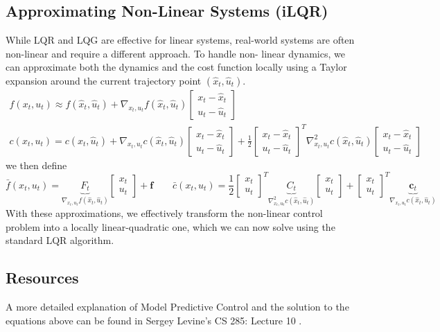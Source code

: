 \subsection{Approximating Non-Linear Systems (iLQR)}
While LQR and LQG are effective for linear systems, real-world systems are often non-linear and require a different approach. To handle non-
linear dynamics, we can approximate both the dynamics and the cost function locally using a Taylor expansion around the current trajectory 
point $(\hat{x}_t,\hat{u}_t)$.
 \begin{gather*}
     f(x_t,u_t) \approx  f(\hat{x}_t,\hat{u}_t)+ \nabla_{x_t,u_t} f(\hat{x}_t,\hat{u}_t) \begin{bmatrix} 
x_t- \hat{x}_t\\ u_t- \hat{u}_t 
\end{bmatrix} \\
c(x_t,u_t) = c(\hat{x}_t,\hat{u}_t) + \nabla_{x_t,u_t} c(\hat{x}_t,\hat{u}_t) \begin{bmatrix} 
x_t- \hat{x}_t\\ u_t- \hat{u}_t 
\end{bmatrix}+
\frac{1}{2} \begin{bmatrix} 
x_t- \hat{x}_t\\ u_t- \hat{u}_t 
\end{bmatrix}^T 
\nabla_{x_t,u_t}^2 c(\hat{x}_t,\hat{u}_t)
\begin{bmatrix} 
x_t- \hat{x}_t\\ u_t- \hat{u}_t 
\end{bmatrix}
 \end{gather*}
 we then define 
$$ \bar{f}(x_t,u_t) = \underbrace{F_t}_{ \nabla_{x_t,u_t} f(\hat{x}_t,\hat{u}_t)}
\begin{bmatrix} 
x_t\\ u_t 
\end{bmatrix}
 + \mathbf{f} \qquad 
 \bar{c}(x_t,u_t) = \frac{1}{2} \begin{bmatrix} 
x_t\\ u_t 
\end{bmatrix}^T \underbrace{C_t}_{\nabla_{x_t,u_t}^2 c(\hat{x}_t,\hat{u}_t)} \begin{bmatrix} 
x_t\\ u_t 
\end{bmatrix}+ \begin{bmatrix} 
x_t\\ u_t 
\end{bmatrix}^T \underbrace{\mathbf{c}_t}_{\nabla_{x_t,u_t} c(\hat{x}_t,\hat{u}_t)}$$
With these approximations, we effectively transform the non-linear control problem into a locally linear-quadratic one, which we can now 
solve using the standard LQR algorithm.

\subsection{Resources}
A more detailed explanation of Model Predictive Control and the solution to the equations above can be found in 
Sergey Levine’s CS 285: Lecture 10 \cite{CS285,CS285LevineYoutube}.
